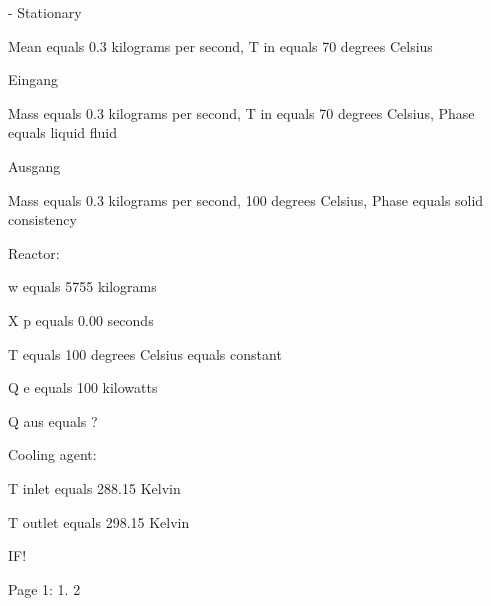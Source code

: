 - Stationary

Mean equals 0.3 kilograms per second, T in equals 70 degrees Celsius

Eingang

Mass equals 0.3 kilograms per second, T in equals 70 degrees Celsius, Phase equals liquid fluid

Ausgang

Mass equals 0.3 kilograms per second, 100 degrees Celsius, Phase equals solid consistency

Reactor:

w equals 5755 kilograms

X p equals 0.00 seconds

T equals 100 degrees Celsius equals constant

Q e equals 100 kilowatts

Q aus equals ?

Cooling agent:

T inlet equals 288.15 Kelvin

T outlet equals 298.15 Kelvin

IF!

Page 1: 1. 2